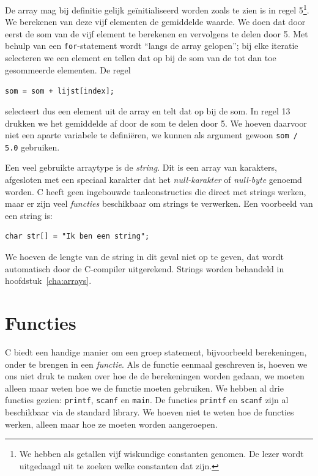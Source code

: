 De array mag bij definitie gelijk geïnitialiseerd worden zoals te zien is in regel 5\footnote{We hebben als getallen vijf wiskundige constanten genomen. De lezer wordt uitgedaagd uit te zoeken welke constanten dat zijn.}. We berekenen van deze vijf elementen de gemiddelde waarde. We doen dat door eerst de som van de vijf element te berekenen en vervolgens te delen door 5. Met behulp van een \texttt{for}-statement wordt ``langs de array gelopen''; bij elke iteratie selecteren we een element en tellen dat op bij de som van de tot dan toe gesommeerde elementen. De regel

\hspace*{1em}\texttt{som = som + lijst[index];}

selecteert dus een element uit de array en telt dat op bij de som. In regel 13 drukken we het gemiddelde af door de som te delen door 5. We hoeven daarvoor niet een aparte variabele te definiëren, we kunnen als argument gewoon \texttt{som / 5.0} gebruiken.

Een veel gebruikte arraytype is de \textsl{string}. Dit is een array van karakters, afgesloten met een speciaal karakter dat het \textsl{null-karakter} of \textsl{null-byte} genoemd worden. C heeft geen ingebouwde taalconstructies die direct met strings werken, maar er zijn veel \textsl{functies} beschikbaar om strings te verwerken. Een voorbeeld van een string is:

\begin{lstlisting}[caption=Voorbeeld van een string.]
char str[] = "Ik ben een string";
\end{lstlisting}

We hoeven de lengte van de string in dit geval niet op te geven, dat wordt automatisch door de C-compiler uitgerekend. Strings worden behandeld in hoofdstuk~\ref{cha:arrays}. 

%

\section{Functies}
C biedt een handige manier om een groep statement, bijvoorbeeld berekeningen, onder te brengen in een \textsl{functie}. Als de functie eenmaal geschreven is, hoeven we ons niet druk te maken over hoe de de berekeningen worden gedaan, we moeten alleen maar weten hoe we de functie moeten gebruiken. We hebben al drie functies gezien: \texttt{printf}, \texttt{scanf} en \texttt{main}. De functies \texttt{printf} en \texttt{scanf} zijn al beschikbaar via de standard library. We hoeven niet te weten hoe de functies werken, alleen maar hoe ze moeten worden aangeroepen.

